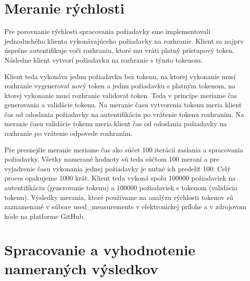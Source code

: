 \begin{table}
  \begin{center}
    \caption{Jednoduchosť práce s knižnicami}
    \label{tab:api_porovnanie} %

  \end{center}
\end{table}

\section{Meranie rýchlosti}

Pre porovnanie rýchlosti spracovania požiadavky sme implementovali jednoduchého klienta vykonávajúceho požiadavky na rozhranie. Klient sa najprv úspešne autentifikuje voči rozhraniu, ktoré mu vráti platný prístupový token. Následne klient vytvorí požiadavku na rozhranie s týmto tokenom.

Klient teda vykonáva jednu požiadavku bez tokenu, na ktorej vykonanie musí rozhranie vygenerovať nový token a jednu požiadavku s platným tokenom, na ktorej vykonanie musí rozhranie validovať token. Teda v princípe meriame čas generovania a validácie tokenu. Na meranie času vytvorenia tokenu meria klient čas od odoslania požiadavky na autentifikáciu po vrátenie tokenu rozhraním. Na meranie času validácie tokenu meria klient čas od odoslania požiadavky na rozhranie po vrátenie odpovede rozhraním.

Pre presnejšie meranie meriame čas ako súčet 100 iterácií zaslania a spracovania požiadavky. Všetky namerané hodnoty sú teda súčtom 100 meraní a pre vyjadrenie času vykonania jednej požiadavky je nutné ich predeliť 100. Celý proces opakujeme 1000 krát. Klient teda vykoná spolu 100000 požiadaviek na autentifikáciu (generovanie tokenu) a 100000 požiadaviek s tokenom (validácia tokenu). Výsledky merania, ktoré používame na analýzu rýchlosti tokenov sú zaznamenané v súbore used\_measurements v elektronickej prílohe a v zdrojovom kóde na platforme GitHub.

\section{Spracovanie a vyhodnotenie nameraných výsledkov}
\label{sec:vyhodnotenie}

